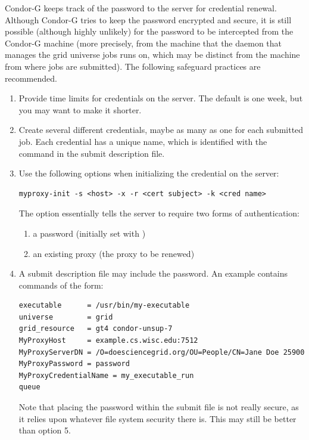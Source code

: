 Condor-G keeps track of the password to the  server
for credential renewal.
Although Condor-G tries to keep the password encrypted and secure,
it is still possible (although highly unlikely) for the password
to be intercepted from the Condor-G machine
(more precisely, from the machine that the
 daemon that manages the grid universe jobs runs on,
which may be distinct from the machine from where jobs are submitted).
The following safeguard practices are recommended.

\begin{enumerate}

\item{Provide time limits}
for credentials on the  server.
The default is one week, but you may want to make it shorter.

\item{Create several different  credentials},
maybe as many as one for each submitted job.
Each credential has a unique name,
which is identified with the
 command in the submit description file.

\item{Use the following options}
when initializing the credential on the  server:

\footnotesize
\begin{verbatim}
myproxy-init -s <host> -x -r <cert subject> -k <cred name>
\end{verbatim}
\normalsize

The option 
essentially tells the  server to require two forms
of authentication:
  \begin{enumerate}
  \item{a password (initially set with )}
  \item{an existing proxy (the proxy to be renewed)}
  \end{enumerate}

\item{A submit description file may include the password.}
An example contains commands of the form:
\footnotesize
\begin{verbatim}
executable      = /usr/bin/my-executable
universe        = grid
grid_resource   = gt4 condor-unsup-7
MyProxyHost     = example.cs.wisc.edu:7512
MyProxyServerDN = /O=doesciencegrid.org/OU=People/CN=Jane Doe 25900
MyProxyPassword = password
MyProxyCredentialName = my_executable_run
queue
\end{verbatim}
\normalsize
Note that placing the password within the submit file
is not really secure,
as it relies upon whatever file system security there is.
This may still be better than option 5.


\end{enumerate}

